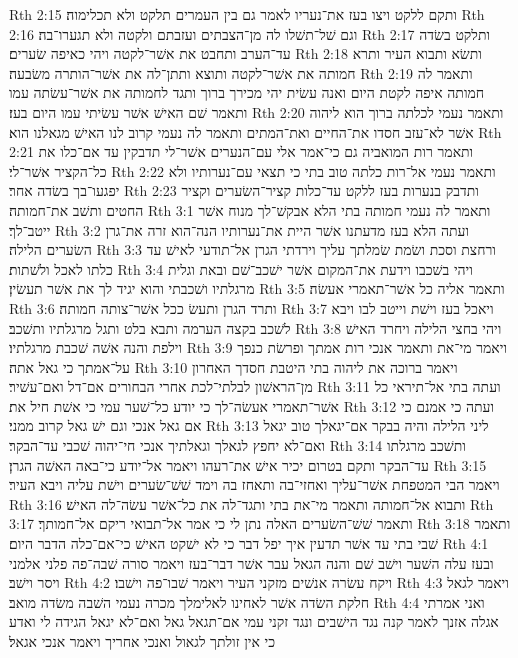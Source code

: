 Rth 2:15  ותקם ללקט ויצו בעז את־נעריו לאמר גם בין העמרים תלקט ולא תכלימוה׃
Rth 2:16  וגם שׁל־תשׁלו לה מן־הצבתים ועזבתם ולקטה ולא תגערו־בה׃
Rth 2:17  ותלקט בשׂדה עד־הערב ותחבט את אשׁר־לקטה ויהי כאיפה שׂערים׃
Rth 2:18  ותשׂא ותבוא העיר ותרא חמותה את אשׁר־לקטה ותוצא ותתן־לה את אשׁר־הותרה משׂבעה׃
Rth 2:19  ותאמר לה חמותה איפה לקטת היום ואנה עשׂית יהי מכירך ברוך ותגד לחמותה את אשׁר־עשׂתה עמו ותאמר שׁם האישׁ אשׁר עשׂיתי עמו היום בעז׃
Rth 2:20  ותאמר נעמי לכלתה ברוך הוא ליהוה אשׁר לא־עזב חסדו את־החיים ואת־המתים ותאמר לה נעמי קרוב לנו האישׁ מגאלנו הוא׃
Rth 2:21  ותאמר רות המואביה גם כי־אמר אלי עם־הנערים אשׁר־לי תדבקין עד אם־כלו את כל־הקציר אשׁר־לי׃
Rth 2:22  ותאמר נעמי אל־רות כלתה טוב בתי כי תצאי עם־נערותיו ולא יפגעו־בך בשׂדה אחר׃
Rth 2:23  ותדבק בנערות בעז ללקט עד־כלות קציר־השׂערים וקציר החטים ותשׁב את־חמותה׃
Rth 3:1  ותאמר לה נעמי חמותה בתי הלא אבקשׁ־לך מנוח אשׁר ייטב־לך׃
Rth 3:2  ועתה הלא בעז מדעתנו אשׁר היית את־נערותיו הנה־הוא זרה את־גרן השׂערים הלילה׃
Rth 3:3  ורחצת וסכת ושׂמת שׂמלתך עליך וירדתי הגרן אל־תודעי לאישׁ עד כלתו לאכל ולשׁתות׃
Rth 3:4  ויהי בשׁכבו וידעת את־המקום אשׁר ישׁכב־שׁם ובאת וגלית מרגלתיו ושׁכבתי והוא יגיד לך את אשׁר תעשׂין׃
Rth 3:5  ותאמר אליה כל אשׁר־תאמרי אעשׂה׃
Rth 3:6  ותרד הגרן ותעשׂ ככל אשׁר־צותה חמותה׃
Rth 3:7  ויאכל בעז וישׁת וייטב לבו ויבא לשׁכב בקצה הערמה ותבא בלט ותגל מרגלתיו ותשׁכב׃
Rth 3:8  ויהי בחצי הלילה ויחרד האישׁ וילפת והנה אשׁה שׁכבת מרגלתיו׃
Rth 3:9  ויאמר מי־את ותאמר אנכי רות אמתך ופרשׂת כנפך על־אמתך כי גאל אתה׃
Rth 3:10  ויאמר ברוכה את ליהוה בתי היטבת חסדך האחרון מן־הראשׁון לבלתי־לכת אחרי הבחורים אם־דל ואם־עשׁיר׃
Rth 3:11  ועתה בתי אל־תיראי כל אשׁר־תאמרי אעשׂה־לך כי יודע כל־שׁער עמי כי אשׁת חיל את׃
Rth 3:12  ועתה כי אמנם כי אם גאל אנכי וגם ישׁ גאל קרוב ממני׃
Rth 3:13  ליני הלילה והיה בבקר אם־יגאלך טוב יגאל ואם־לא יחפץ לגאלך וגאלתיך אנכי חי־יהוה שׁכבי עד־הבקר׃
Rth 3:14  ותשׁכב מרגלתו עד־הבקר ותקם בטרום יכיר אישׁ את־רעהו ויאמר אל־יודע כי־באה האשׁה הגרן׃
Rth 3:15  ויאמר הבי המטפחת אשׁר־עליך ואחזי־בה ותאחז בה וימד שׁשׁ־שׂערים וישׁת עליה ויבא העיר׃
Rth 3:16  ותבוא אל־חמותה ותאמר מי־את בתי ותגד־לה את כל־אשׁר עשׂה־לה האישׁ׃
Rth 3:17  ותאמר שׁשׁ־השׂערים האלה נתן לי כי אמר אל־תבואי ריקם אל־חמותך׃
Rth 3:18  ותאמר שׁבי בתי עד אשׁר תדעין איך יפל דבר כי לא ישׁקט האישׁ כי־אם־כלה הדבר היום׃
Rth 4:1  ובעז עלה השׁער וישׁב שׁם והנה הגאל עבר אשׁר דבר־בעז ויאמר סורה שׁבה־פה פלני אלמני ויסר וישׁב׃
Rth 4:2  ויקח עשׂרה אנשׁים מזקני העיר ויאמר שׁבו־פה וישׁבו׃
Rth 4:3  ויאמר לגאל חלקת השׂדה אשׁר לאחינו לאלימלך מכרה נעמי השׁבה משׂדה מואב׃
Rth 4:4  ואני אמרתי אגלה אזנך לאמר קנה נגד הישׁבים ונגד זקני עמי אם־תגאל גאל ואם־לא יגאל הגידה לי ואדע כי אין זולתך לגאול ואנכי אחריך ויאמר אנכי אגאל׃
